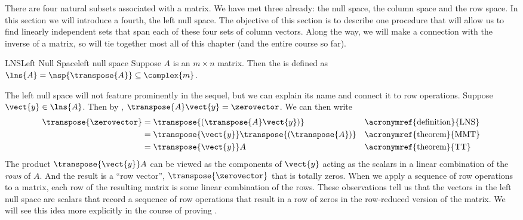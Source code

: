 %
There are four natural subsets associated with a matrix.  We have met three already: the null space, the column space and the row space.  In this section we will introduce a fourth, the left null space.  The objective of this section is to describe one procedure that will allow us to find linearly independent sets that span each of these four sets of column vectors.  Along the way, we will make a connection with the inverse of a matrix, so  will tie together most all of this chapter (and the entire course so far).\par
%
%
%
\begin{definition}{LNS}{Left Null Space}{left null space}
Suppose $A$ is an $m\times n$ matrix.  Then the  is defined as $\lns{A}=\nsp{\transpose{A}}\subseteq\complex{m}$.
\end{definition}
%
The left null space will not feature prominently in the sequel, but we can explain its name and connect it to row operations.   Suppose $\vect{y}\in\lns{A}$.  Then by , $\transpose{A}\vect{y}=\zerovector$.  We can then write
%
\begin{align*}
\transpose{\zerovector}
&=\transpose{\left(\transpose{A}\vect{y}\right)}
&&\text{\acronymref{definition}{LNS}}\\
%
&=\transpose{\vect{y}}\transpose{\left(\transpose{A}\right)}
&&\text{\acronymref{theorem}{MMT}}\\
%
&=\transpose{\vect{y}}A
&&\text{\acronymref{theorem}{TT}}
%
\end{align*}
%
The product $\transpose{\vect{y}}A$ can be viewed as the components of $\vect{y}$ acting as the scalars in a linear combination of the {\em rows} of $A$.  And the result is a ``row vector'', $\transpose{\zerovector}$ that is totally zeros.  When we apply a sequence of row operations to a matrix, each row of the resulting matrix is some linear combination of the rows.  These observations tell us that the vectors in the left null space are scalars that record a sequence of row operations that result in a row of zeros in the row-reduced version of the matrix.  We will see this idea more explicitly in the course of proving .
